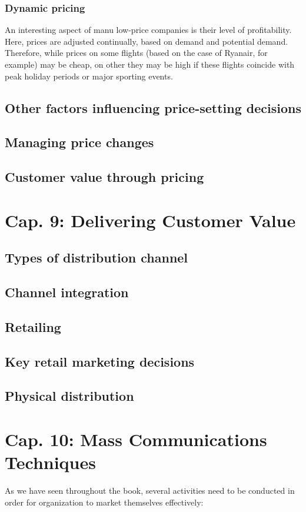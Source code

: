 \documentclass{article}
\begin{document}
\subsubsection*{Dynamic pricing}
An interesting aspect of manu low-price companies is their level of profitability. Here, prices are adjusted continually, based on demand and potential demand. Therefore, while prices on some flights (based on the case of Ryanair, for example) may be cheap, on other they may be high if these flights coincide with peak holiday periods or major sporting events.

\subsection{Other factors influencing price-setting decisions}
\subsection{Managing price changes}
\subsection{Customer value through pricing}

\section{Cap. 9: Delivering Customer Value}


\subsection{Types of distribution channel}
\subsection{Channel integration}
\subsection{Retailing}
\subsection{Key retail marketing decisions}
\subsection{Physical distribution}

\section{Cap. 10: Mass Communications Techniques}
As we have seen throughout the book, several activities need to be conducted in order for organization to market themselves effectively: 
\end{document}
